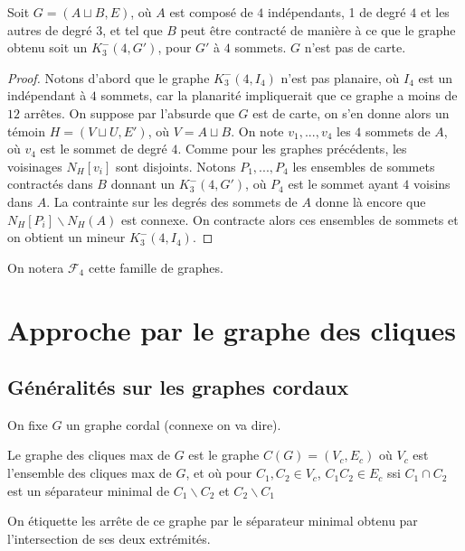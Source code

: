 \documentclass{scrartcl}
\begin{document}
\begin{flushleft}
\begin{prop}
    Soit $G = (A \sqcup B, E)$, où $A$ est composé de $4$ indépendants, 1 de degré $4$ et
    les autres de degré $3$, et tel que $B$ peut être contracté de manière à ce que le graphe
    obtenu soit un $K^-_3(4, G')$, pour $G'$ à $4$ sommets. $G$ n'est pas de carte.
\end{prop}

\begin{proof}
    Notons d'abord que le graphe $K^-_3(4, I_4)$ n'est pas planaire, où $I_4$ est un indépendant à
    $4$ sommets, car la planarité impliquerait que ce graphe a moins de $12$ arrêtes.
    \medskip \newline
    On suppose par l'absurde que $G$ est de carte, on s'en donne alors un témoin $H = (V \sqcup U, E')$,
    où $V = A \sqcup B$. On note $v_1, ..., v_4$ les $4$ sommets de $A$, où $v_4$ est le sommet
    de degré $4$. Comme pour les graphes précédents, les voisinages $N_H[v_i]$ sont disjoints.
    Notons $P_1, ..., P_4$ les ensembles de sommets contractés dans $B$ donnant un
    $K^-_3(4, G')$, où $P_4$ est le sommet ayant $4$ voisins dans $A$. La contrainte sur
    les degrés des sommets de $A$ donne là encore que $N_H[P_i] \backslash N_H(A)$ est connexe.
    On contracte alors ces ensembles de sommets et on obtient un mineur $K^-_3(4, I_4)$.
\end{proof}

On notera $\mathcal{F}_4$ cette famille de graphes.

\section{Approche par le graphe des cliques}

\subsection{Généralités sur les graphes cordaux}

On fixe $G$ un graphe cordal (connexe on va dire).

\begin{def*}
    Le graphe des cliques max de $G$ est le graphe $C(G) = (V_c, E_c)$ où $V_c$ est l'ensemble
    des cliques max de $G$, et où pour $C_1, C_2 \in V_c$, $C_1 C_2 \in E_c$ ssi $C_1 \cap C_2$
    est un séparateur minimal de $C_1 \backslash C_2$ et $C_2 \backslash C_1$
\end{def*}

On étiquette les arrête de ce graphe par le séparateur minimal obtenu par l'intersection de ses
deux extrémités.


\end{flushleft}
\end{document}
